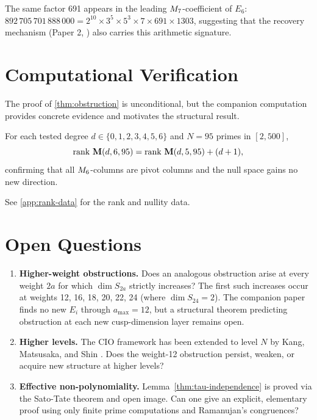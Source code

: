 \documentclass[11pt]{article}
\begin{document}
\begin{remark}
The same factor 691 appears in the leading $M_{7}$-coefficient of $E_6$:
$892\,705\,701\,888\,000 = 2^{10}\times 3^5\times 5^3\times 7\times 691\times 1303$,
suggesting that the recovery mechanism (Paper 2, \cite{Randsley2025c}) also carries
this arithmetic signature.
\end{remark}

\section{Computational Verification}
\label{sec:computational}

The proof of \cref{thm:obstruction} is unconditional, but the companion computation
provides concrete evidence and motivates the structural result.

\begin{proposition}
For each tested degree $d\in\{0,1,2,3,4,5,6\}$ and $N=95$ primes in $[2,500]$,
\[
  \operatorname{rank}\,\mathbf{M}(d,6,95) = \operatorname{rank}\,\mathbf{M}(d,5,95) + (d+1),
\]
confirming that all $M_{6}$-columns are pivot columns and the null space gains no new
direction.
\end{proposition}

See \cref{app:rank-data} for the rank and nullity data.

\section{Open Questions}
\label{sec:open}

\begin{enumerate}[leftmargin=*,label=\textbf{(\arabic*)}]

\item \textbf{Higher-weight obstructions.}
Does an analogous obstruction arise at every weight $2a$ for which $\dim S_{2a}$ strictly
increases?
The first such increases occur at weights 12, 16, 18, 20, 22, 24 (where $\dim S_{24}=2$).
The companion paper \cite{Randsley2025b} finds no new $E_i$ through $a_{\max}=12$, but
a structural theorem predicting obstruction at each new cusp-dimension layer remains open.

\item \textbf{Higher levels.}
The CIO framework has been extended to level $N$ by Kang, Matsusaka, and Shin
\cite{KMS2024}.
Does the weight-12 obstruction persist, weaken, or acquire new structure at higher levels?

\item \textbf{Effective non-polynomiality.}
Lemma~\ref{thm:tau-independence} is proved via the Sato-Tate theorem and open image.
Can one give an explicit, elementary proof using only finite prime computations and
Ramanujan's congruences?

\end{enumerate}
\end{document}

